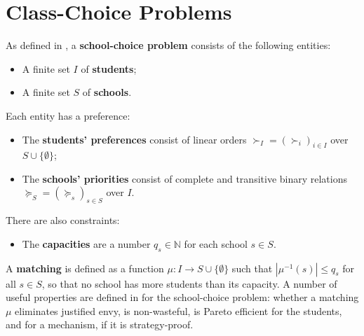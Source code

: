 \documentclass[12pt,letterpaper]{extarticle}
\begin{document}
\section{Class-Choice Problems}
As defined in \cite{w5b}, a \textbf{school-choice problem} consists of the following entities:
\begin{itemize}
    \item A finite set $I$ of \textbf{students};
    \item A finite set $S$ of \textbf{schools}.
\end{itemize}
Each entity has a preference:
\begin{itemize}
    \item The \textbf{students' preferences} consist of linear orders $\succ_I = (\succ_i)_{i \in I}$ over $S \cup \{\emptyset\}$;
    \item The \textbf{schools' priorities} consist of complete and transitive binary relations $\succcurlyeq_S = (\succcurlyeq_s)_{s \in S}$ over $I$.
\end{itemize}
There are also constraints:
\begin{itemize}
    \item The \textbf{capacities} are a number $q_s \in \mathbb{N}$ for each school $s \in S$.
\end{itemize}
A \textbf{matching} is defined as a function $\mu : I \to S \cup \{\emptyset\}$ such that $|\mu^{-1}(s)| \leq q_s$ for all $s \in S$, so that no school has more students than its capacity. A number of useful properties are defined in \cite{w5b} for the school-choice problem: whether a matching $\mu$ eliminates justified envy, is non-wasteful, is Pareto efficient for the students, and for a mechanism, if it is strategy-proof.
\end{document}
